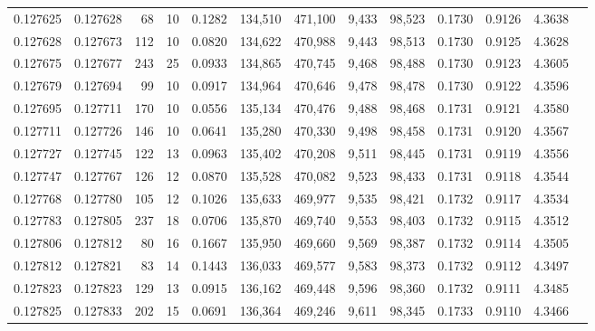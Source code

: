 \begin{tabular}{rrrrrrrrrrrrr}
0.127625 & 0.127628 &    68 &  10 &                                     0.1282 & 134,510 & 471,100 &   9,433 &  98,523 & 0.1730 & 0.9126 & 4.3638 \\
0.127628 & 0.127673 &   112 &  10 &                                     0.0820 & 134,622 & 470,988 &   9,443 &  98,513 & 0.1730 & 0.9125 & 4.3628 \\
0.127675 & 0.127677 &   243 &  25 &                                     0.0933 & 134,865 & 470,745 &   9,468 &  98,488 & 0.1730 & 0.9123 & 4.3605 \\
0.127679 & 0.127694 &    99 &  10 &                                     0.0917 & 134,964 & 470,646 &   9,478 &  98,478 & 0.1730 & 0.9122 & 4.3596 \\
0.127695 & 0.127711 &   170 &  10 &                                     0.0556 & 135,134 & 470,476 &   9,488 &  98,468 & 0.1731 & 0.9121 & 4.3580 \\
0.127711 & 0.127726 &   146 &  10 &                                     0.0641 & 135,280 & 470,330 &   9,498 &  98,458 & 0.1731 & 0.9120 & 4.3567 \\
0.127727 & 0.127745 &   122 &  13 &                                     0.0963 & 135,402 & 470,208 &   9,511 &  98,445 & 0.1731 & 0.9119 & 4.3556 \\
0.127747 & 0.127767 &   126 &  12 &                                     0.0870 & 135,528 & 470,082 &   9,523 &  98,433 & 0.1731 & 0.9118 & 4.3544 \\
0.127768 & 0.127780 &   105 &  12 &                                     0.1026 & 135,633 & 469,977 &   9,535 &  98,421 & 0.1732 & 0.9117 & 4.3534 \\
0.127783 & 0.127805 &   237 &  18 &                                     0.0706 & 135,870 & 469,740 &   9,553 &  98,403 & 0.1732 & 0.9115 & 4.3512 \\
0.127806 & 0.127812 &    80 &  16 &                                     0.1667 & 135,950 & 469,660 &   9,569 &  98,387 & 0.1732 & 0.9114 & 4.3505 \\
0.127812 & 0.127821 &    83 &  14 &                                     0.1443 & 136,033 & 469,577 &   9,583 &  98,373 & 0.1732 & 0.9112 & 4.3497 \\
0.127823 & 0.127823 &   129 &  13 &                                     0.0915 & 136,162 & 469,448 &   9,596 &  98,360 & 0.1732 & 0.9111 & 4.3485 \\
0.127825 & 0.127833 &   202 &  15 &                                     0.0691 & 136,364 & 469,246 &   9,611 &  98,345 & 0.1733 & 0.9110 & 4.3466 \\

\end{tabular}
